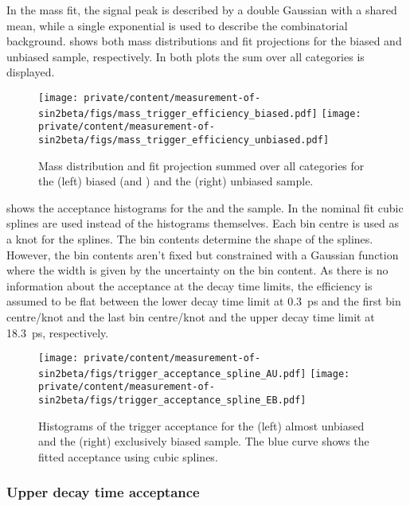 In the mass fit, the signal peak is described by a double Gaussian with a shared
mean, while a single exponential is used to describe the combinatorial
background. 
shows both mass distributions and fit projections for the biased and unbiased
sample, respectively. In both plots the sum over all categories is displayed.
%
\begin{figure}
\texttt{[image: private/content/measurement-of-sin2beta/figs/mass\_trigger\_efficiency\_biased.pdf]}
\texttt{[image: private/content/measurement-of-sin2beta/figs/mass\_trigger\_efficiency\_unbiased.pdf]}
\caption{Mass distribution and fit projection summed over all categories for
the (left) biased (\catAU and \catEB) and the (right) unbiased sample.}
\label{fig:measurement_of_sin2beta:resolution_and_acceptance:acceptance:lower:mass_fits}
\end{figure}
%
shows the acceptance histograms for the \catAU and the \catEB sample. In the
nominal fit cubic splines \cite{Karbach:2014qba} are used instead of the
histograms themselves. Each bin centre is used as a knot for the splines. The
bin contents determine the shape of the splines. However, the bin contents
aren't fixed but constrained with a Gaussian function where the width is given
by the uncertainty on the bin content. As there is no information about the
acceptance at the decay time limits, the efficiency is assumed to be flat
between the lower decay time limit at \SI{0.3}{\ps} and the first bin
centre/knot and the last bin centre/knot and the upper decay time limit at
\SI{18.3}{\ps}, respectively.
%
\begin{figure}
\texttt{[image: private/content/measurement-of-sin2beta/figs/trigger\_acceptance\_spline\_AU.pdf]}
\texttt{[image: private/content/measurement-of-sin2beta/figs/trigger\_acceptance\_spline\_EB.pdf]}
\caption{Histograms of the trigger acceptance for the (left) almost unbiased and
the (right) exclusively biased sample. The blue curve shows the fitted
acceptance using cubic splines.}
\label{fig:measurement_of_sin2beta:resolution_and_acceptance:acceptance:lower:splines}
\end{figure}

\subsubsection{Upper decay time acceptance}
\label{sec:measurement_of_sin2beta:resolution_and_acceptance:acceptance:upper}

